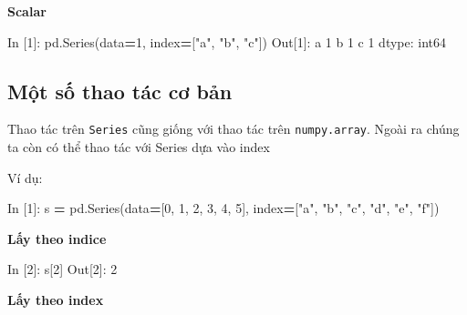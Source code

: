 \documentclass[
]{book}
\newenvironment{Shaded}{\begin{snugshade}}{\end{snugshade}}
\newcommand{\DecValTok}[1]{\textcolor[rgb]{0.00,0.00,0.81}{#1}}
\newcommand{\NormalTok}[1]{#1}
\newcommand{\OperatorTok}[1]{\textcolor[rgb]{0.81,0.36,0.00}{\textbf{#1}}}
\newcommand{\StringTok}[1]{\textcolor[rgb]{0.31,0.60,0.02}{#1}}
\begin{document}
\textbf{Scalar}

\begin{Shaded}
\begin{Highlighting}[]
\NormalTok{In [}\DecValTok{1}\NormalTok{]: pd.Series(data}\OperatorTok{=}\DecValTok{1}\NormalTok{, index}\OperatorTok{=}\NormalTok{[}\StringTok{"a"}\NormalTok{, }\StringTok{"b"}\NormalTok{, }\StringTok{"c"}\NormalTok{])}
\NormalTok{Out[}\DecValTok{1}\NormalTok{]: }
\NormalTok{a    }\DecValTok{1}
\NormalTok{b    }\DecValTok{1}
\NormalTok{c    }\DecValTok{1}
\NormalTok{dtype: int64}
\end{Highlighting}
\end{Shaded}

\hypertarget{mux1ed9t-sux1ed1-thao-tuxe1c-cux1a1-bux1ea3n}{%
\subsection*{Một số thao tác cơ bản}\label{mux1ed9t-sux1ed1-thao-tuxe1c-cux1a1-bux1ea3n}}

Thao tác trên \texttt{Series} cũng giống với thao tác trên \texttt{numpy.array}. Ngoài ra chúng ta còn có thể thao tác với Series dựa vào index

Ví dụ:

\begin{Shaded}
\begin{Highlighting}[]
\NormalTok{In [}\DecValTok{1}\NormalTok{]: s }\OperatorTok{=}\NormalTok{ pd.Series(data}\OperatorTok{=}\NormalTok{[}\DecValTok{0}\NormalTok{, }\DecValTok{1}\NormalTok{, }\DecValTok{2}\NormalTok{, }\DecValTok{3}\NormalTok{, }\DecValTok{4}\NormalTok{, }\DecValTok{5}\NormalTok{], index}\OperatorTok{=}\NormalTok{[}\StringTok{"a"}\NormalTok{, }\StringTok{"b"}\NormalTok{, }\StringTok{"c"}\NormalTok{, }\StringTok{"d"}\NormalTok{, }\StringTok{"e"}\NormalTok{, }\StringTok{"f"}\NormalTok{])}
\end{Highlighting}
\end{Shaded}

\textbf{Lấy theo indice}

\begin{Shaded}
\begin{Highlighting}[]
\NormalTok{In [}\DecValTok{2}\NormalTok{]: s[}\DecValTok{2}\NormalTok{]}
\NormalTok{Out[}\DecValTok{2}\NormalTok{]: }\DecValTok{2}
\end{Highlighting}
\end{Shaded}

\textbf{Lấy theo index}
\end{document}
